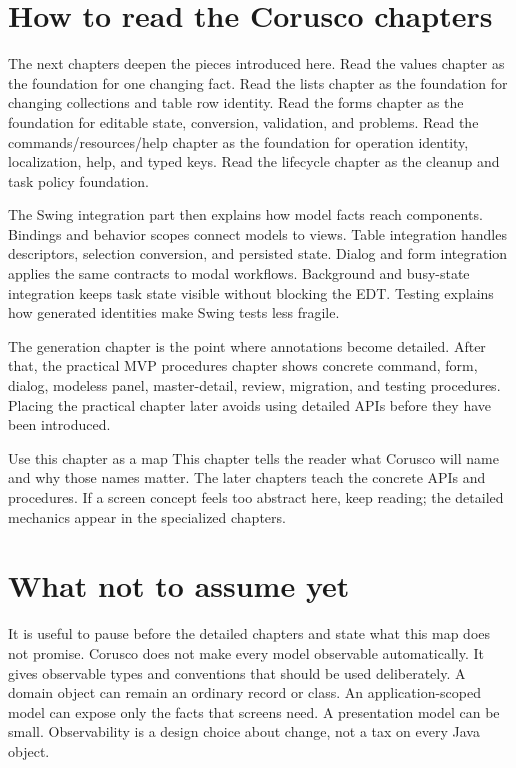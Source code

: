 \section{How to read the Corusco chapters}

The next chapters deepen the pieces introduced here. Read the values chapter as the foundation for one changing fact. Read the lists chapter as the foundation for changing collections and table row identity. Read the forms chapter as the foundation for editable state, conversion, validation, and problems. Read the commands/resources/help chapter as the foundation for operation identity, localization, help, and typed keys. Read the lifecycle chapter as the cleanup and task policy foundation.

The Swing integration part then explains how model facts reach components. Bindings and behavior scopes connect models to views. Table integration handles descriptors, selection conversion, and persisted state. Dialog and form integration applies the same contracts to modal workflows. Background and busy-state integration keeps task state visible without blocking the EDT. Testing explains how generated identities make Swing tests less fragile.

The generation chapter is the point where annotations become detailed. After that, the practical MVP procedures chapter shows concrete command, form, dialog, modeless panel, master-detail, review, migration, and testing procedures. Placing the practical chapter later avoids using detailed APIs before they have been introduced.

\begin{principlebox}{Use this chapter as a map}
This chapter tells the reader what Corusco will name and why those names matter. The later chapters teach the concrete APIs and procedures. If a screen concept feels too abstract here, keep reading; the detailed mechanics appear in the specialized chapters.
\end{principlebox}

\section{What not to assume yet}

It is useful to pause before the detailed chapters and state what this map does not promise. Corusco does not make every model observable automatically. It gives observable types and conventions that should be used deliberately. A domain object can remain an ordinary record or class. An application-scoped model can expose only the facts that screens need. A presentation model can be small. Observability is a design choice about change, not a tax on every Java object.

